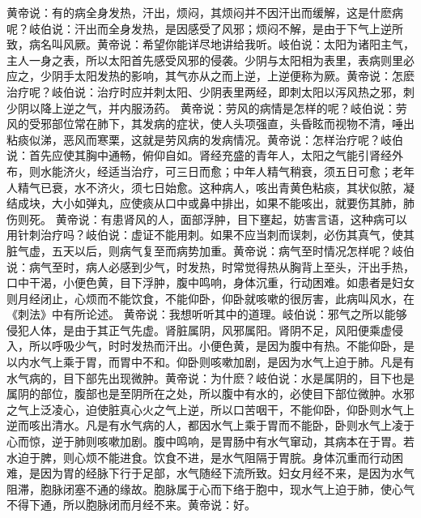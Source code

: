 \documentclass[a4paper,12pt,UTF8,twoside]{ctexbook}
\begin{document}
黄帝说：有的病全身发热，汗出，烦闷，其烦闷并不因汗出而缓解，这是什麽病呢？岐伯说：汗出而全身发热，是因感受了风邪；烦闷不解，是由于下气上逆所致，病名叫风厥。黄帝说：希望你能详尽地讲给我听。岐伯说：太阳为诸阳主气，主人一身之表，所以太阳首先感受风邪的侵袭。少阴与太阳相为表里，表病则里必应之，少阴手太阳发热的影响，其气亦从之而上逆，上逆便称为厥。黄帝说：怎麽治疗呢？岐伯说：治疗时应并刺太阳、少阴表里两经，即刺太阳以泻风热之邪，刺少阴以降上逆之气，并内服汤药。
黄帝说：劳风的病情是怎样的呢？岐伯说：劳风的受邪部位常在肺下，其发病的症状，使人头项强直，头昏眩而视物不清，唾出粘痰似涕，恶风而寒栗，这就是劳风病的发病情况。黄帝说：怎样治疗呢？岐伯说：首先应使其胸中通畅，俯仰自如。肾经充盛的青年人，太阳之气能引肾经外布，则水能济火，经适当治疗，可三日而愈；中年人精气稍衰，须五日可愈；老年人精气已衰，水不济火，须七日始愈。这种病人，咳出青黄色粘痰，其状似脓，凝结成块，大小如弹丸，应使痰从口中或鼻中排出，如果不能咳出，就要伤其肺，肺伤则死。
黄帝说：有患肾风的人，面部浮肿，目下壅起，妨害言语，这种病可以用针刺治疗吗？岐伯说：虚证不能用刺。如果不应当刺而误刺，必伤其真气，使其脏气虚，五天以后，则病气复至而病势加重。黄帝说：病气至时情况怎样呢？岐伯说：病气至时，病人必感到少气，时发热，时常觉得热从胸背上至头，汗出手热，口中干渴，小便色黄，目下浮肿，腹中鸣响，身体沉重，行动困难。如患者是妇女则月经闭止，心烦而不能饮食，不能仰卧，仰卧就咳嗽的很厉害，此病叫风水，在《刺法》中有所论述。
黄帝说：我想听听其中的道理。岐伯说：邪气之所以能够侵犯人体，是由于其正气先虚。肾脏属阴，风邪属阳。肾阴不足，风阳便乘虚侵入，所以呼吸少气，时时发热而汗出。小便色黄，是因为腹中有热。不能仰卧，是以内水气上乘于胃，而胃中不和。仰卧则咳嗽加剧，是因为水气上迫于肺。凡是有水气病的，目下部先出现微肿。黄帝说：为什麽？岐伯说：水是属阴的，目下也是属阴的部位，腹部也是至阴所在之处，所以腹中有水的，必使目下部位微肿。水邪之气上泛凌心，迫使脏真心火之气上逆，所以口苦咽干，不能仰卧，仰卧则水气上逆而咳出清水。凡是有水气病的人，都因水气上乘于胃而不能卧，卧则水气上凌于心而惊，逆于肺则咳嗽加剧。腹中鸣响，是胃肠中有水气窜动，其病本在于胃。若水迫于脾，则心烦不能进食。饮食不进，是水气阻隔于胃脘。身体沉重而行动困难，是因为胃的经脉下行于足部，水气随经下流所致。妇女月经不来，是因为水气阻滞，胞脉闭塞不通的缘故。胞脉属于心而下络于胞中，现水气上迫于肺，使心气不得下通，所以胞脉闭而月经不来。黄帝说：好。
\end{document}
